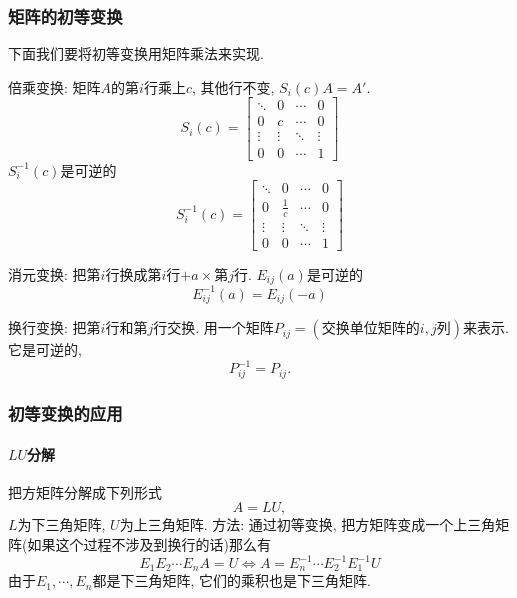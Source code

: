\subsubsection{矩阵的初等变换}
下面我们要将初等变换用矩阵乘法来实现.

倍乘变换: 矩阵$A$的第$i$行乘上$c$, 其他行不变, $S_i(c) A = A'$.
\begin{equation}
  S_i (c) = \begin{bmatrix}
    \ddots&0&\cdots&0\\
    0&c&\cdots&0\\
    \vdots&\vdots&\ddots&\vdots\\
    0&0&\cdots&1
  \end{bmatrix}
\end{equation}
% 
% 
% 
% 
% 
% 
% 
$S^{-1}_i (c)$是可逆的
\begin{equation}
  S^{-1}_i (c) = \begin{bmatrix}
    \ddots&0&\cdots&0\\
    0&\frac{1}{c}&\cdots&0\\
    \vdots&\vdots&\ddots&\vdots\\
    0&0&\cdots&1
  \end{bmatrix}
\end{equation}

消元变换: 
把第$i$行换成第$i$行$+ a \times $第$j$行.
% 
% 
% 
% 
% 
% 
$E_{ij}(a)$是可逆的
\begin{equation}
  E_{ij}^{-1}(a) = E_{ij}(-a)
\end{equation}

换行变换:
把第$i$行和第$j$行交换. 用一个矩阵$P_{ij} = (\text{交换单位矩阵的$i,j$列})$来表示.
它是可逆的,
\begin{equation}
  P^{-1}_{ij}= P_{ij}.
\end{equation}

\subsubsection{初等变换的应用}
\paragraph{$LU$分解}
把方矩阵分解成下列形式 
\begin{equation}
  A = LU,
\end{equation}
$L$为下三角矩阵, $U$为上三角矩阵.
方法: 通过初等变换, 把方矩阵变成一个上三角矩阵(如果这个过程不涉及到换行的话)那么有
\begin{equation}
  E_1 E_2 \cdots E_{n} A = U \iff A = E_n ^{-1} \cdots E_2^{-1} E_1^{-1} U
\end{equation}
由于$E_1 ,\cdots ,E_n$都是下三角矩阵, 它们的乘积也是下三角矩阵.


